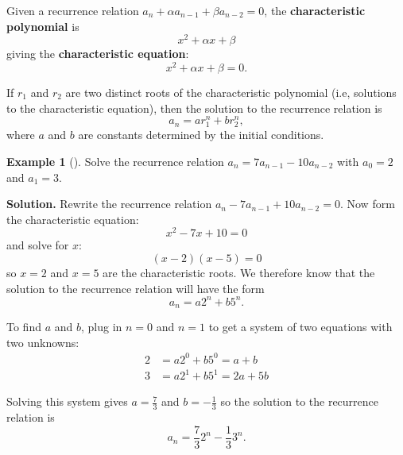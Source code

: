 \documentclass[10pt,]{book}
\newcommand{\terminology}[1]{\textbf{#1}}
\theoremstyle{plain}
\theoremstyle{definition}
\theoremstyle{definition}
\newtheorem{example}[theorem]{Example}
\theoremstyle{definition}
\theoremstyle{definition}
\numberwithin{equation}{chapter}
\newcommand{\amp}{&}
\begin{document}
\begin{assemblage}\label{assemblage-6}
\hypertarget{p-328}{}%
 Given a recurrence relation \(a_n + \alpha a_{n-1} + \beta a_{n-2} = 0\), the \terminology{characteristic polynomial} is%
\begin{equation*}
x^2 + \alpha x + \beta
\end{equation*}
giving the \terminology{characteristic equation}:%
\begin{equation*}
x^2 + \alpha x + \beta = 0.
\end{equation*}
%
\par
\hypertarget{p-329}{}%
If \(r_1\) and \(r_2\) are two distinct roots of the characteristic polynomial (i.e, solutions to the characteristic equation), then the solution to the recurrence relation is%
\begin{equation*}
a_n = ar_1^n + br_2^n,
\end{equation*}
where \(a\) and \(b\) are constants determined by the initial conditions.%
\end{assemblage}
\begin{example}[]\label{example-23}
\hypertarget{p-330}{}%
Solve the recurrence relation \(a_n = 7a_{n-1} - 10 a_{n-2}\) with \(a_0 = 2\) and \(a_1 = 3\).%
\par\smallskip%
\noindent\textbf{Solution.}\hypertarget{solution-37}{}\quad%
\hypertarget{p-331}{}%
Rewrite the recurrence relation \(a_n - 7a_{n-1} + 10a_{n-2} = 0\). Now form the characteristic equation:%
\begin{equation*}
x^2 - 7x + 10 = 0
\end{equation*}
and solve for \(x\):%
\begin{equation*}
(x - 2) (x - 5) = 0
\end{equation*}
so \(x = 2\) and \(x = 5\) are the characteristic roots. We therefore know that the solution to the recurrence relation will have the form%
\begin{equation*}
a_n = a 2^n + b 5^n.
\end{equation*}
%
\par
\hypertarget{p-332}{}%
To find \(a\) and \(b\), plug in \(n =0\) and \(n = 1\) to get a system of two equations with two unknowns:%
\begin{align*}
2 \amp = a 2^0 + b 5^0 = a + b\\
3 \amp = a 2^1 + b 5^1 = 2a + 5b
\end{align*}
%
\par
\hypertarget{p-333}{}%
Solving this system gives \(a = \frac{7}{3}\) and \(b = -\frac{1}{3}\) so the solution to the recurrence relation is%
\begin{equation*}
a_n = \frac{7}{3}2^n - \frac{1}{3} 3^n.
\end{equation*}
%
\end{example}
\end{document}
